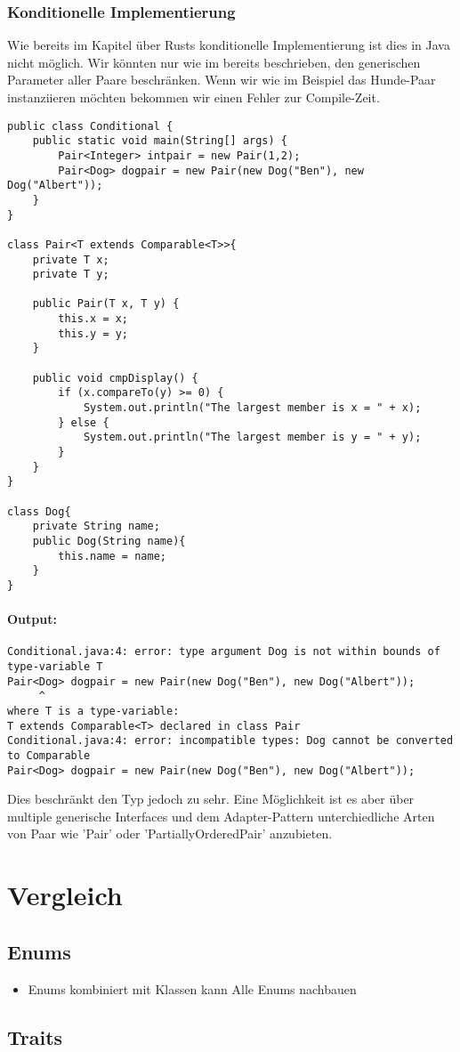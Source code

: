 \documentclass[a4paper, 1ppt]{article}
\begin{document}
\subsubsection{Konditionelle Implementierung}
Wie bereits im Kapitel über Rusts konditionelle Implementierung ist dies in Java nicht möglich.
Wir könnten nur wie im bereits beschrieben, den generischen Parameter aller Paare beschränken.
Wenn wir wie im Beispiel das Hunde-Paar instanziieren möchten bekommen wir einen Fehler zur Compile-Zeit.
\begin{verbatim}
public class Conditional {
    public static void main(String[] args) {
        Pair<Integer> intpair = new Pair(1,2);
        Pair<Dog> dogpair = new Pair(new Dog("Ben"), new Dog("Albert"));
    }    
}

class Pair<T extends Comparable<T>>{
    private T x;
    private T y;

    public Pair(T x, T y) {
        this.x = x;
        this.y = y;
    }

    public void cmpDisplay() {
        if (x.compareTo(y) >= 0) {
            System.out.println("The largest member is x = " + x);
        } else {
            System.out.println("The largest member is y = " + y);
        }
    }
}

class Dog{
    private String name;
    public Dog(String name){
        this.name = name;
    }
}
\end{verbatim}
\paragraph{Output:}
\begin{verbatim}
Conditional.java:4: error: type argument Dog is not within bounds of type-variable T
Pair<Dog> dogpair = new Pair(new Dog("Ben"), new Dog("Albert"));
	 ^
where T is a type-variable:
T extends Comparable<T> declared in class Pair
Conditional.java:4: error: incompatible types: Dog cannot be converted to Comparable
Pair<Dog> dogpair = new Pair(new Dog("Ben"), new Dog("Albert"));
\end{verbatim}
Dies beschränkt den Typ jedoch zu sehr. Eine Möglichkeit ist es aber über multiple generische Interfaces und dem Adapter-Pattern unterchiedliche Arten von Paar wie 'Pair' oder 'PartiallyOrderedPair' anzubieten.
\newpage
\section{Vergleich}
\subsection{Enums}
\begin{itemize}
	\item Enums kombiniert mit Klassen kann Alle Enums nachbauen
\end{itemize}
\subsection{Traits}



\end{document}
